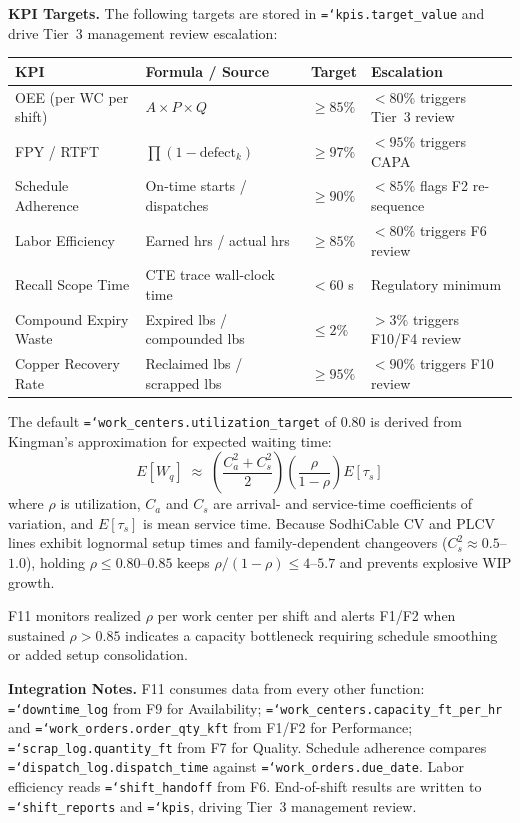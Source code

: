 \documentclass[11pt]{article}
\newcommand{\tfield}[1]{\texttt{\hyphenchar\font=`\-\relax #1}}
\begin{document}
\textbf{KPI Targets.}  The following targets are stored in \tfield{kpis.target\_value} and drive Tier~3 management review escalation:
\begin{center}\footnotesize
\begin{tabular}{@{} l l l l @{}}
\toprule
\textbf{KPI} & \textbf{Formula / Source} & \textbf{Target} & \textbf{Escalation} \\
\midrule
OEE (per WC per shift) & $A \times P \times Q$ & $\geq 85\%$ & $< 80\%$ triggers Tier~3 review \\
FPY / RTFT & $\prod(1 - \text{defect}_k)$ & $\geq 97\%$ & $< 95\%$ triggers CAPA \\
Schedule Adherence & On-time starts / dispatches & $\geq 90\%$ & $< 85\%$ flags F2 re-sequence \\
Labor Efficiency & Earned hrs / actual hrs & $\geq 85\%$ & $< 80\%$ triggers F6 review \\
Recall Scope Time & CTE trace wall-clock time & $< 60$ s & Regulatory minimum \\
Compound Expiry Waste & Expired lbs / compounded lbs & $\leq 2\%$ & $> 3\%$ triggers F10/F4 review \\
Copper Recovery Rate & Reclaimed lbs / scrapped lbs & $\geq 95\%$ & $< 90\%$ triggers F10 review \\
\bottomrule
\end{tabular}
\end{center}

\begin{eqbox}
The default \tfield{work\_centers.utilization\_target} of 0.80 is derived from Kingman's approximation for expected waiting time:
\[
E[W_q] \;\approx\; \left(\frac{C_a^2 + C_s^2}{2}\right)\!\left(\frac{\rho}{1-\rho}\right) E[\tau_s]
\]
where $\rho$ is utilization, $C_a$ and $C_s$ are arrival- and service-time coefficients of variation, and $E[\tau_s]$ is mean service time.  Because SodhiCable CV and PLCV lines exhibit lognormal setup times and family-dependent changeovers ($C_s^2 \approx 0.5$--$1.0$), holding $\rho \leq 0.80$--$0.85$ keeps $\rho/(1-\rho) \leq 4$--$5.7$ and prevents explosive WIP growth.
\end{eqbox}

F11 monitors realized $\rho$ per work center per shift and alerts F1/F2 when sustained $\rho > 0.85$ indicates a capacity bottleneck requiring schedule smoothing or added setup consolidation.

\textbf{Integration Notes.}
F11 consumes data from every other function: \tfield{downtime\_log} from F9 for Availability; \tfield{work\_centers.capacity\_ft\_per\_hr} and \tfield{work\_orders.order\_qty\_kft} from F1/F2 for Performance; \tfield{scrap\_log.quantity\_ft} from F7 for Quality.  Schedule adherence compares \tfield{dispatch\_log.dispatch\_time} against \tfield{work\_orders.due\_date}.  Labor efficiency reads \tfield{shift\_handoff} from F6.  End-of-shift results are written to \tfield{shift\_reports} and \tfield{kpis}, driving Tier~3 management review.
\end{document}
